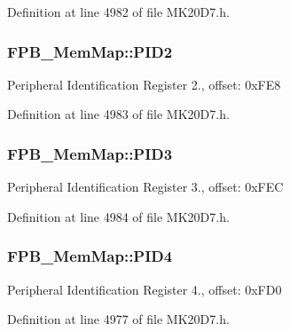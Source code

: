 Definition at line 4982 of file M\+K20\+D7.\+h.

\subsubsection[{\texorpdfstring{P\+I\+D2}{PID2}}]{ F\+P\+B\+\_\+\+Mem\+Map\+::\+P\+I\+D2}\hypertarget{struct_f_p_b___mem_map_a1a53923b7f5f3565b3c23fcfacc76232}{}\label{struct_f_p_b___mem_map_a1a53923b7f5f3565b3c23fcfacc76232}
Peripheral Identification Register 2., offset\+: 0x\+F\+E8 

Definition at line 4983 of file M\+K20\+D7.\+h.

\subsubsection[{\texorpdfstring{P\+I\+D3}{PID3}}]{ F\+P\+B\+\_\+\+Mem\+Map\+::\+P\+I\+D3}\hypertarget{struct_f_p_b___mem_map_a50469498a2399ab61bfa9c1826a1932a}{}\label{struct_f_p_b___mem_map_a50469498a2399ab61bfa9c1826a1932a}
Peripheral Identification Register 3., offset\+: 0x\+F\+EC 

Definition at line 4984 of file M\+K20\+D7.\+h.

\subsubsection[{\texorpdfstring{P\+I\+D4}{PID4}}]{ F\+P\+B\+\_\+\+Mem\+Map\+::\+P\+I\+D4}\hypertarget{struct_f_p_b___mem_map_a4c24f21441de38f5d96099cf78723401}{}\label{struct_f_p_b___mem_map_a4c24f21441de38f5d96099cf78723401}
Peripheral Identification Register 4., offset\+: 0x\+F\+D0 

Definition at line 4977 of file M\+K20\+D7.\+h.

